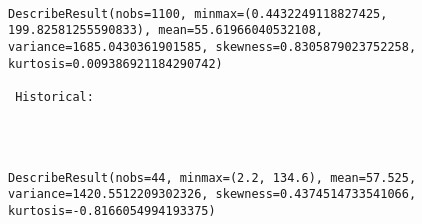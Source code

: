 \documentclass[11pt]{article}
\begin{document}
    \begin{center}
    \end{center}
    { \hspace*{\fill} \\}
    
    \begin{Verbatim}[commandchars=\\\{\}]
DescribeResult(nobs=1100, minmax=(0.4432249118827425, 199.82581255590833), mean=55.61966040532108, variance=1685.0430361901585, skewness=0.8305879023752258, kurtosis=0.009386921184290742)

 Historical: 
 

    \end{Verbatim}

    \begin{center}
    \end{center}
    { \hspace*{\fill} \\}
    
    \begin{Verbatim}[commandchars=\\\{\}]
DescribeResult(nobs=44, minmax=(2.2, 134.6), mean=57.525, variance=1420.5512209302326, skewness=0.4374514733541066, kurtosis=-0.8166054994193375) 



    \end{Verbatim}


    
    
    
    
\end{document}
